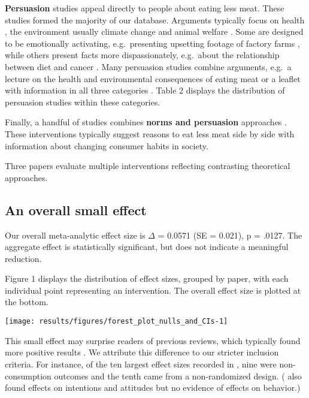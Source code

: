 \documentclass[sn-nature,pdflatex]{sn-jnl}
\begin{document}
\textbf{Persuasion}
\citep{kanchanachitra2020, abrahamse2007, acharya2004, berndsen2005, bertolaso2015, bianchi2022, bochmann2017, bschaden2020, carfora2023, cooney2016, fehrenbach2015, feltz2022, haile2021, hatami2018, hennessy2016, mathur2021effectiveness, norris2014, peacock2017, polanco2022, sparkman2021, jalil2023, merrill2009, weingarten2022}
studies appeal directly to people about eating less meat. These studies
formed the majority of our database. Arguments typically focus on health
\citep{weingarten2022}, the environment \citep{carfora2023}
\textemdash usually climate change \textemdash and animal welfare
\citep{haile2021}. Some are designed to be emotionally activating,
e.g.~presenting upsetting footage of factory farms
\citep{bertolaso2015}, while others present facts more dispassionately,
e.g.~about the relationship between diet and cancer \citep{hatami2018}.
Many persuasion studies combine arguments, e.g.~a lecture on the health
and environmental consequences of eating meat \citep{jalil2023} or a
leaflet with information in all three categories \citep{hennessy2016}.
Table 2 displays the distribution of persuasion studies within these
categories.

Finally, a handful of studies combines \textbf{norms and persuasion}
approaches \citep{hennessy2016, carfora2023, mattson2020, piester2020}.
These interventions typically suggest reasons to eat less meat side by
side with information about changing consumer habits in society.

Three papers \citep{piester2020, hennessy2016, kanchanachitra2020}
evaluate multiple interventions reflecting contrasting theoretical
approaches.

\subsection{An overall small effect}\label{sec2.2}

Our overall meta-analytic effect size is \(\Delta\) = 0.0571 (SE =
0.021), p = .0127. The aggregate effect is statistically significant,
but does not indicate a meaningful reduction.

Figure 1 displays the distribution of effect sizes, grouped by paper,
with each individual point representing an intervention. The overall
effect size is plotted at the bottom.

\texttt{[image: results/figures/forest\_plot\_nulls\_and\_CIs-1]}

This small effect may surprise readers of previous reviews, which
typically found more positive results
\citep{mathur2021meta, meier2022, chang2023}. We attribute this
difference to our stricter inclusion criteria. For instance, of the ten
largest effect sizes recorded in \citep{mathur2021effectiveness}, nine
were non-consumption outcomes and the tenth came from a non-randomized
design. (\citep{bianchi2018conscious} also found effects on intentions
and attitudes but no evidence of effects on behavior.)
\end{document}
